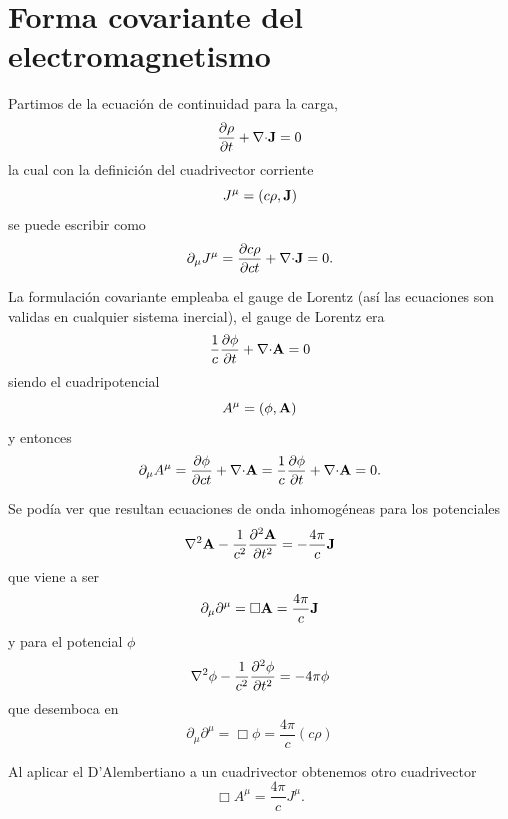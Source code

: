\documentclass[10pt,oneside]{CBFT_book}
\begin{document}
\section{Forma covariante del electromagnetismo}

Partimos de la ecuación de continuidad para la carga,
\[
	\dpar{\rho}{t} + \divem{J} = 0
\]
la cual con la definición del cuadrivector corriente
\[
	J^\mu = ( c\rho , \vb{J} )
\]
se puede escribir como 
\[
	\partial_\mu J^\mu = \dpar{c\rho}{ct} + \divem{J} = 0 .
\]

La formulación covariante empleaba el gauge de Lorentz (así las ecuaciones son validas en cualquier sistema
inercial), el gauge de Lorentz era
\[
	\frac{1}{c} \dpar{\phi}{t} + \divem{A} = 0
\]
siendo el cuadripotencial
\[
	A^\mu = ( \phi , \vb{A} ) 
\]
y entonces 
\[
	\partial_\mu A^\mu = \dpar{\phi}{ct} + \divem{A} = \frac{1}{c} \dpar{\phi}{t} + \divem{A} = 0 .
\]

Se podía ver que resultan ecuaciones de onda inhomogéneas para los potenciales
\[
	\Nabla^2 \vb{A} - \frac{1}{c^2} \dpar[2]{\vb{A}}{t} = -\frac{4\pi}{c} \vb{J}
\]
que viene a ser 
\[
	\partial_\mu\partial^\mu = \Box \vb{A} = \frac{4\pi}{c} \vb{J}
\]
y para el potencial $\phi$
\[
	\Nabla^2 \phi - \frac{1}{c^2} \dpar[2]{\phi}{t} = - 4\pi \phi
\]
que desemboca en 
\[
	\partial_\mu\partial^\mu = \Box \phi = \frac{4\pi}{c} ( c\rho )
\]

Al aplicar el D'Alembertiano a un cuadrivector obtenemos otro cuadrivector 
\[
	\Box A^\mu = \frac{4\pi}{c} J^\mu.
\]
\end{document}
